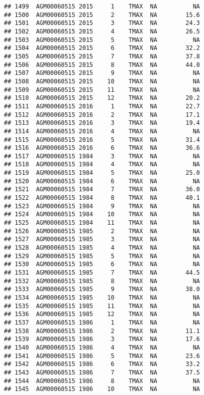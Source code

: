 \documentclass{article}\usepackage[]{graphicx}\usepackage[]{color}
\makeatletter
\newenvironment{kframe}{%
 \def\at@end@of@kframe{}%
 \ifinner\ifhmode%
  \def\at@end@of@kframe{\end{minipage}}%
  \begin{minipage}{\columnwidth}%
 \fi\fi%
 \def\FrameCommand##1{\hskip\@totalleftmargin \hskip-\fboxsep
 \colorbox{shadecolor}{##1}\hskip-\fboxsep
     \hskip-\linewidth \hskip-\@totalleftmargin \hskip\columnwidth}%
 \MakeFramed {\advance\hsize-\width
   \@totalleftmargin\z@ \linewidth\hsize
   \@setminipage}}%
 {\par\unskip\endMakeFramed%
 \at@end@of@kframe}
\newenvironment{knitrout}{}{} %
\makeatother
\begin{document}
\begin{knitrout}
\begin{kframe}
\begin{verbatim}
## 1499  AGM00060515 2015     1    TMAX  NA          NA
## 1500  AGM00060515 2015     2    TMAX  NA        15.6
## 1501  AGM00060515 2015     3    TMAX  NA        24.3
## 1502  AGM00060515 2015     4    TMAX  NA        26.5
## 1503  AGM00060515 2015     5    TMAX  NA          NA
## 1504  AGM00060515 2015     6    TMAX  NA        32.2
## 1505  AGM00060515 2015     7    TMAX  NA        37.8
## 1506  AGM00060515 2015     8    TMAX  NA        44.0
## 1507  AGM00060515 2015     9    TMAX  NA          NA
## 1508  AGM00060515 2015    10    TMAX  NA          NA
## 1509  AGM00060515 2015    11    TMAX  NA          NA
## 1510  AGM00060515 2015    12    TMAX  NA        20.2
## 1511  AGM00060515 2016     1    TMAX  NA        22.7
## 1512  AGM00060515 2016     2    TMAX  NA        17.1
## 1513  AGM00060515 2016     3    TMAX  NA        19.4
## 1514  AGM00060515 2016     4    TMAX  NA          NA
## 1515  AGM00060515 2016     5    TMAX  NA        31.4
## 1516  AGM00060515 2016     6    TMAX  NA        36.6
## 1517  AGM00060515 1984     3    TMAX  NA          NA
## 1518  AGM00060515 1984     4    TMAX  NA          NA
## 1519  AGM00060515 1984     5    TMAX  NA        25.0
## 1520  AGM00060515 1984     6    TMAX  NA          NA
## 1521  AGM00060515 1984     7    TMAX  NA        36.0
## 1522  AGM00060515 1984     8    TMAX  NA        40.1
## 1523  AGM00060515 1984     9    TMAX  NA          NA
## 1524  AGM00060515 1984    10    TMAX  NA          NA
## 1525  AGM00060515 1984    11    TMAX  NA          NA
## 1526  AGM00060515 1985     2    TMAX  NA          NA
## 1527  AGM00060515 1985     3    TMAX  NA          NA
## 1528  AGM00060515 1985     4    TMAX  NA          NA
## 1529  AGM00060515 1985     5    TMAX  NA          NA
## 1530  AGM00060515 1985     6    TMAX  NA          NA
## 1531  AGM00060515 1985     7    TMAX  NA        44.5
## 1532  AGM00060515 1985     8    TMAX  NA          NA
## 1533  AGM00060515 1985     9    TMAX  NA        38.0
## 1534  AGM00060515 1985    10    TMAX  NA          NA
## 1535  AGM00060515 1985    11    TMAX  NA          NA
## 1536  AGM00060515 1985    12    TMAX  NA          NA
## 1537  AGM00060515 1986     1    TMAX  NA          NA
## 1538  AGM00060515 1986     2    TMAX  NA        11.1
## 1539  AGM00060515 1986     3    TMAX  NA        17.6
## 1540  AGM00060515 1986     4    TMAX  NA          NA
## 1541  AGM00060515 1986     5    TMAX  NA        23.6
## 1542  AGM00060515 1986     6    TMAX  NA        33.2
## 1543  AGM00060515 1986     7    TMAX  NA        37.5
## 1544  AGM00060515 1986     8    TMAX  NA          NA
## 1545  AGM00060515 1986    10    TMAX  NA          NA

\end{verbatim}
\end{kframe}
\end{knitrout}
\end{document}
